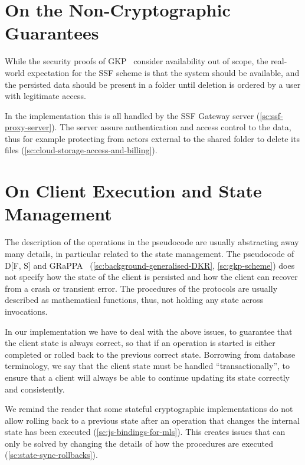\section{On the Non-Cryptographic Guarantees}\label{sc:gap-non-crypto-guarantees}

While the security proofs of GKP~\cite{GKP} consider availability out of
scope, the real-world expectation for the SSF scheme
is that the system should be
available, and the persisted data should be present in 
a folder until deletion is ordered by a user with
legitimate access.

In the implementation this is all handled by the SSF Gateway server
(\cref{sc:ssf-proxy-server}).
The server assure authentication and access control
to the data, thus for example protecting from actors 
external to the shared folder to delete its files (\cref{sc:cloud-storage-access-and-billing}). 

\section{On Client Execution and State Management}\label{sc:gap-execution-multi-tenancy-state-management}

The description of the operations in the pseudocode are usually abstracting away many details,
in particular related to the state management.
The pseudocode of D[F, S] and GRaPPA~\cite{GKP} (\cref{sc:background-generalised-DKR}, \cref{sc:gkp-scheme}) 
does not specify how the state of the client is persisted 
and how the client can recover from a crash or transient error.
The procedures of the protocols are usually described as
mathematical functions, thus, not holding any state across
invocations.

In our implementation we have to deal with the above issues,
to guarantee that the client state is always correct,
so that if an operation is started is either completed
or rolled back to the previous correct state.
Borrowing from database terminology, we say that the client
state must be handled ``transactionally'', to ensure that
a client will always be able to continue updating its state
correctly and consistently.

We remind the reader that some stateful cryptographic implementations do not
allow rolling back to a previous state after an operation
that changes the internal state has been executed (\cref{sc:js-bindings-for-mls}).
This creates issues that can only be solved by changing
the details of how the procedures are executed (\cref{sc:state-sync-rollbacks}).

